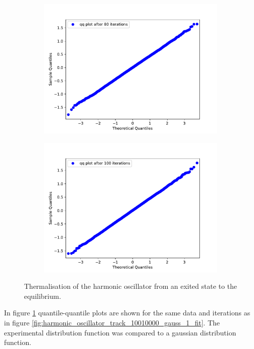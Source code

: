 \documentclass{scrartcl}
\begin{document}
\begin{figure}[H]
\begin{subfigure}[c]{0.32\textwidth}
				\includegraphics[width=\textwidth]{../imgs/harmonic_oscillator_track/track_10010000_qq_80.pdf}
			\end{subfigure}
			\begin{subfigure}[c]{0.32\textwidth}
				\includegraphics[width=\textwidth]{../imgs/harmonic_oscillator_track/track_10010000_qq_100.pdf}
			\end{subfigure}
			\caption{Thermalisation of the harmonic oscillator from an exited state to the equilibrium.}
			\label{fig:harmonic_oscillator_track_track_10010000_qqs}
		\end{figure}
		In figure \ref{fig:harmonic_oscillator_track_track_10010000_qqs} quantile-quantile plots are shown for the same data and iterations as in figure \ref{fig:harmonic_oscillator_track_10010000_gauss_1_fit}.
		The experimental distribution function was compared to a gaussian distribution function.
\end{document}
